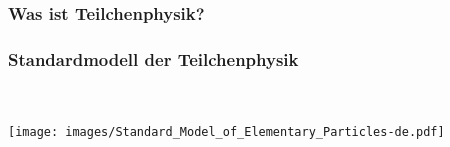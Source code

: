 \documentclass[10pt,t]{beamer}
\begin{document}
\begin{frame}
\frametitle{Was ist Teilchenphysik?}
\vspace*{-\baselineskip}\normalsize
{}
\end{frame}


\begin{frame}\centering
\frametitle{Standardmodell der Teilchenphysik}
\vspace*{-2.5\baselineskip}
\begin{columns}
~\\[-\baselineskip]
    \texttt{[image: images/Standard\_Model\_of\_Elementary\_Particles-de.pdf]}
~\\[4cm]
     \\[0.5cm]
\end{columns}
\vspace*{-5pt}
\end{frame}
\end{document}
